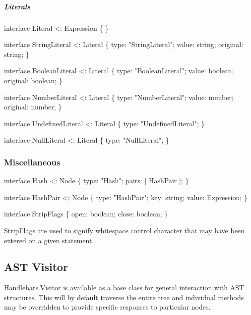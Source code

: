 \subparagraph*{Literals}


\begin{DoxyCode}
\textcolor{keyword}{interface }Literal <: Expression \{ \}

\textcolor{keyword}{interface }StringLiteral <: Literal \{
    type: \textcolor{stringliteral}{"StringLiteral"};
    value: string;
    original: string;
\}

\textcolor{keyword}{interface }BooleanLiteral <: Literal \{
    type: \textcolor{stringliteral}{"BooleanLiteral"};
    value: boolean;
    original: boolean;
\}

\textcolor{keyword}{interface }NumberLiteral <: Literal \{
    type: \textcolor{stringliteral}{"NumberLiteral"};
    value: number;
    original: number;
\}

\textcolor{keyword}{interface }UndefinedLiteral <: Literal \{
    type: \textcolor{stringliteral}{"UndefinedLiteral"};
\}

\textcolor{keyword}{interface }NullLiteral <: Literal \{
    type: \textcolor{stringliteral}{"NullLiteral"};
\}
\end{DoxyCode}


\subsubsection*{Miscellaneous}


\begin{DoxyCode}
\textcolor{keyword}{interface }Hash <: Node \{
    type: \textcolor{stringliteral}{"Hash"};
    pairs: [ HashPair ];
\}

\textcolor{keyword}{interface }HashPair <: Node \{
    type: \textcolor{stringliteral}{"HashPair"};
    key: string;
    value: Expression;
\}

\textcolor{keyword}{interface }StripFlags \{
    open: boolean;
    close: boolean;
\}
\end{DoxyCode}


{\ttfamily Strip\+Flags} are used to signify whitespace control character that may have been entered on a given statement.

\subsection*{A\+ST Visitor}

{\ttfamily Handlebars.\+Visitor} is available as a base class for general interaction with A\+ST structures. This will by default traverse the entire tree and individual methods may be overridden to provide specific responses to particular nodes.

